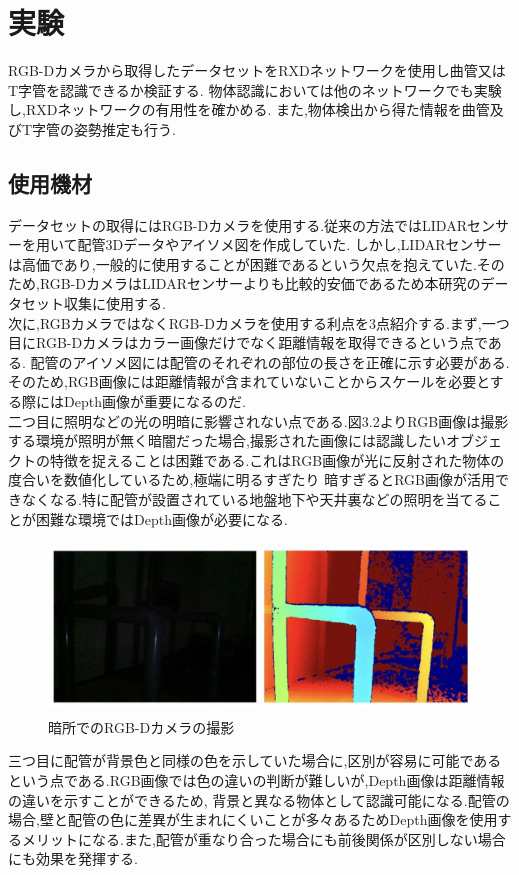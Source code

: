 \chapter{実験}

RGB-Dカメラから取得したデータセットをRXDネットワークを使用し曲管又はT字管を認識できるか検証する.
物体認識においては他のネットワークでも実験し,RXDネットワークの有用性を確かめる.
また,物体検出から得た情報を曲管及びT字管の姿勢推定も行う.

\section{使用機材}
データセットの取得にはRGB-Dカメラを使用する.従来の方法ではLIDARセンサーを用いて配管3Dデータやアイソメ図を作成していた.
しかし,LIDARセンサーは高価であり,一般的に使用することが困難であるという欠点を抱えていた.そのため,RGB-DカメラはLIDARセンサーよりも比較的安価であるため本研究のデータセット収集に使用する.\\
次に,RGBカメラではなくRGB-Dカメラを使用する利点を3点紹介する.まず,一つ目にRGB-Dカメラはカラー画像だけでなく距離情報を取得できるという点である.
配管のアイソメ図には配管のそれぞれの部位の長さを正確に示す必要がある.そのため,RGB画像には距離情報が含まれていないことからスケールを必要とする際にはDepth画像が重要になるのだ.\\
二つ目に照明などの光の明暗に影響されない点である.図3.2よりRGB画像は撮影する環境が照明が無く暗闇だった場合,撮影された画像には認識したいオブジェクトの特徴を捉えることは困難である.これはRGB画像が光に反射された物体の度合いを数値化しているため,極端に明るすぎたり
暗すぎるとRGB画像が活用できなくなる.特に配管が設置されている地盤地下や天井裏などの照明を当てることが困難な環境ではDepth画像が必要になる.\\
\begin{figure}[htbt]
    \centering
     \includegraphics[height=45mm]{pipe_rgbd.eps}
     \caption{暗所でのRGB-Dカメラの撮影}
     \label{fig:f2}
\end{figure}
三つ目に配管が背景色と同様の色を示していた場合に,区別が容易に可能であるという点である.RGB画像では色の違いの判断が難しいが,Depth画像は距離情報の違いを示すことができるため,
背景と異なる物体として認識可能になる.配管の場合,壁と配管の色に差異が生まれにくいことが多々あるためDepth画像を使用するメリットになる.また,配管が重なり合った場合にも前後関係が区別しない場合にも効果を発揮する.\\

